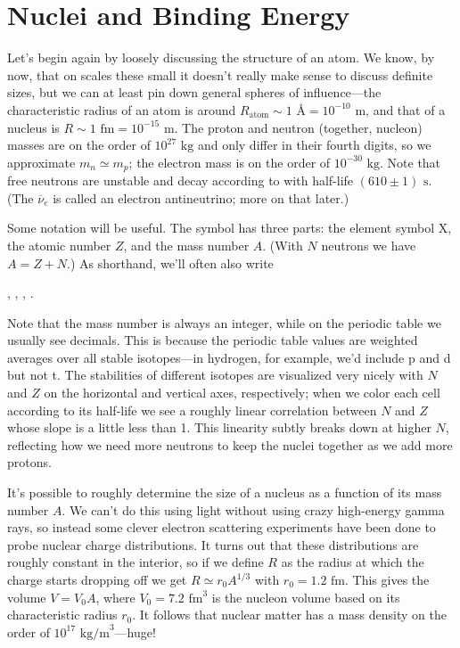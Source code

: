 \documentclass[../p052main.tex]{subfiles}
\begin{document}
\section{Nuclei and Binding Energy}
Let's begin again by loosely discussing the structure of an atom.
We know, by now, that on scales these small it doesn't really make sense to discuss definite sizes, but we can at least pin down general spheres of influence---the characteristic radius of an atom is around $R_\textrm{atom} \sim 1 \textrm{ \AA} = 10^{-10} \textrm{ m}$, and that of a nucleus is $R \sim 1 \textrm{ fm} = 10^{-15} \textrm{ m}$.
The proton and neutron (together, nucleon) masses are on the order of $10^{27} \textrm{ kg}$ and only differ in their fourth digits, so we approximate $m_n \simeq m_p$; the electron mass is on the order of $10^{-30} \textrm{ kg}$.
Note that free neutrons are unstable and decay according to  with half-life $(610 \pm 1) \text{ s}$.
(The $\overline{\nu}_e$ is called an electron antineutrino; more on that later.)

Some notation will be useful.
The symbol  has three parts: the element symbol X, the atomic number $Z$, and the mass number $A$.
(With $N$ neutrons we have $A = Z + N$.)
As shorthand, we'll often also write
\begin{center}
    , \quad {}, \quad {}, \quad {}.
\end{center}
Note that the mass number is always an integer, while on the periodic table we usually see decimals.
This is because the periodic table values are weighted averages over all stable isotopes---in hydrogen, for example, we'd include p and d but not t.
The stabilities of different isotopes are visualized very nicely with $N$ and $Z$ on the horizontal and vertical axes, respectively; when we color each cell according to its half-life we see a roughly linear correlation between $N$ and $Z$ whose slope is a little less than 1.
This linearity subtly breaks down at higher $N$, reflecting how we need more neutrons to keep the nuclei together as we add more protons.

It's possible to roughly determine the size of a nucleus as a function of its mass number $A$.
We can't do this using light without using crazy high-energy gamma rays, so instead some clever electron scattering experiments have been done to probe nuclear charge distributions.
It turns out that these distributions are roughly constant in the interior, so if we define $R$ as the radius at which the charge starts dropping off we get $R \simeq r_0 A^{1 / 3}$ with $r_0 = 1.2 \textrm{ fm}$.
This gives the volume $V = V_0 A$, where $V_0 = 7.2 \textrm{ fm}^3$ is the nucleon volume based on its characteristic radius $r_0$.
It follows that nuclear matter has a mass density on the order of $10^{17} \textrm{ kg/m}^3$---huge!
\end{document}
